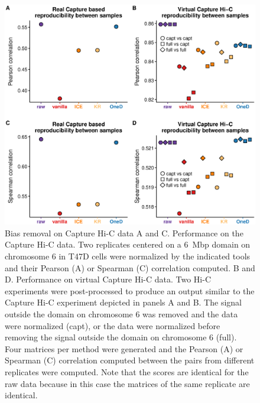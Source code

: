 \documentclass[12pt]{report}
\begin{document}
\begin{figure}
	\centerline{\includegraphics[width=\textwidth]{nar_figures/supp_figure_14.eps}}
    \caption{Bias removal on Capture Hi-C data A and C. Performance on the Capture
    Hi-C data. Two replicates centered on a 6~Mbp domain on chromosome 6 in
    T47D cells were normalized by the indicated tools and their
    Pearson (A) or Spearman (C) correlation computed. B and D. Performance on virtual
    Capture Hi-C  data. Two Hi-C experiments were post-processed to produce an output
    similar to the Capture Hi-C experiment depicted in panels A and B. The signal
    outside the domain on chromosome 6 was removed and the data were
    normalized (capt), or the data were normalized before removing the signal
    outside the domain on chromosome 6 (full). Four matrices per method were
    generated and the Pearson (A) or Spearman (C) correlation computed between the
    pairs from different replicates were computed. Note that the scores are identical
    for the raw data because in this case the matrices of the same replicate are
    identical.}
\end{figure}
\end{document}
